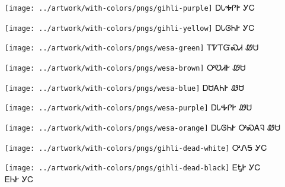 \documentclass[avery5371]{flashcards}%
\begin{document}
    \begin{flashcard}{
        \texttt{[image: ../artwork/with-colors/pngs/gihli-purple]}
    }
        \Huge ᎠᏓᎭᎵᎨ ᎩᏟ
    \end{flashcard}

    \begin{flashcard}{
        \texttt{[image: ../artwork/with-colors/pngs/gihli-yellow]}
    }
        \Huge ᎠᏓᎶᏂᎨ ᎩᏟ
    \end{flashcard}

    \begin{flashcard}{
        \texttt{[image: ../artwork/with-colors/pngs/wesa-green]}
    }
        \Huge ᎢᏤᎢᏳᏍᏗ ᏪᏌ
    \end{flashcard}

    \begin{flashcard}{
        \texttt{[image: ../artwork/with-colors/pngs/wesa-brown]}
    }
        \Huge ᎤᏬᏗᎨ ᏪᏌ
    \end{flashcard}

    \begin{flashcard}{
        \texttt{[image: ../artwork/with-colors/pngs/wesa-blue]}
    }
        \Huge ᎠᏌᎪᏂᎨ ᏪᏌ
    \end{flashcard}

    \begin{flashcard}{
        \texttt{[image: ../artwork/with-colors/pngs/wesa-purple]}
    }
        \Huge ᎠᏓᎭᎵᎨ ᏪᏌ
    \end{flashcard}

    \begin{flashcard}{
        \texttt{[image: ../artwork/with-colors/pngs/wesa-orange]}
    }
        \Huge ᎠᏓᎶᏂᎨ ᎤᏍᎪᎸ ᏪᏌ
    \end{flashcard}

    \begin{flashcard}{
        \texttt{[image: ../artwork/with-colors/pngs/gihli-dead-white]}
    }
        \Huge ᎤᏁᎦ ᎩᏟ
    \end{flashcard}

    \begin{flashcard}{
        \texttt{[image: ../artwork/with-colors/pngs/gihli-dead-black]}
    }
        \Huge ᎬᎿᎨ ᎩᏟ\\ᎬᏂᎨ ᎩᏟ
    \end{flashcard}
\end{document}
